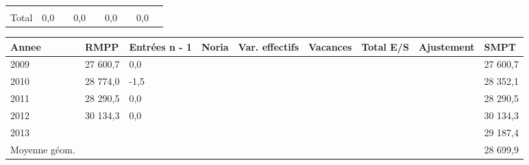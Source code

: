 \begin{longtable}[]{@{}lllllllll@{}}
\begin{minipage}[t]{0.06\columnwidth}
\strut
\end{minipage} & \begin{minipage}[t]{0.13\columnwidth}\raggedright
\strut
\end{minipage} & \begin{minipage}[t]{0.06\columnwidth}\raggedright
\strut
\end{minipage} & \begin{minipage}[t]{0.05\columnwidth}\raggedright
\strut
\end{minipage} & \begin{minipage}[t]{0.06\columnwidth}\raggedright
\strut
\end{minipage}\tabularnewline
\begin{minipage}[t]{0.05\columnwidth}\raggedright
Total\strut
\end{minipage} & \begin{minipage}[t]{0.10\columnwidth}\raggedright
0,0\strut
\end{minipage} & \begin{minipage}[t]{0.06\columnwidth}\raggedright
\strut
\end{minipage} & \begin{minipage}[t]{0.17\columnwidth}\raggedright
0,0\strut
\end{minipage} & \begin{minipage}[t]{0.06\columnwidth}\raggedright
\strut
\end{minipage} & \begin{minipage}[t]{0.13\columnwidth}\raggedright
0,0\strut
\end{minipage} & \begin{minipage}[t]{0.06\columnwidth}\raggedright
\strut
\end{minipage} & \begin{minipage}[t]{0.05\columnwidth}\raggedright
0,0\strut
\end{minipage} & \begin{minipage}[t]{0.06\columnwidth}\raggedright
\strut
\end{minipage}\tabularnewline
\bottomrule
\end{longtable}

\begin{longtable}[]{@{}lllllllll@{}}
\toprule
Annee & RMPP & Entrées n - 1 & Noria & Var. effectifs & Vacances & Total
E/S & Ajustement & SMPT\tabularnewline
\midrule
\endhead
2009 & 27 600,7 & 0,0 & & & & & & 27 600,7\tabularnewline
2010 & 28 774,0 & -1,5 & & & & & & 28 352,1\tabularnewline
2011 & 28 290,5 & 0,0 & & & & & & 28 290,5\tabularnewline
2012 & 30 134,3 & 0,0 & & & & & & 30 134,3\tabularnewline
2013 & & & & & & & & 29 187,4\tabularnewline
Moyenne géom. & & & & & & & & 28 699,9\tabularnewline
\bottomrule
\end{longtable}

